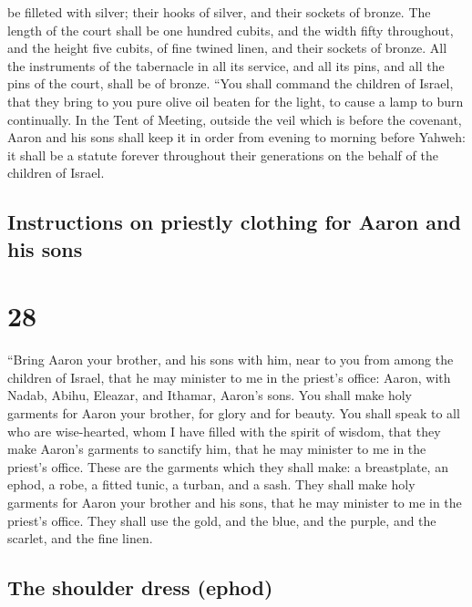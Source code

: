 be filleted with silver; their hooks of silver, and their sockets of
bronze.  The length of the court shall be one hundred
cubits, and the width fifty throughout, and the height five cubits, of
fine twined linen, and their sockets of bronze.  All the
instruments of the tabernacle in all its service, and all its pins, and
all the pins of the court, shall be of bronze.  ``You
shall command the children of Israel, that they bring to you pure olive
oil beaten for the light, to cause a lamp to burn continually.
 In the Tent of Meeting, outside the veil which is before
the covenant, Aaron and his sons shall keep it in order from evening to
morning before Yahweh: it shall be a statute forever throughout their
generations on the behalf of the children of Israel.

\hypertarget{instructions-on-priestly-clothing-for-aaron-and-his-sons}{%
\subsection{Instructions on priestly clothing for Aaron and his
sons}\label{instructions-on-priestly-clothing-for-aaron-and-his-sons}}

\hypertarget{section-27}{%
\section{28}\label{section-27}}

 ``Bring Aaron your brother, and his sons with him, near
to you from among the children of Israel, that he may minister to me in
the priest's office: Aaron, with Nadab, Abihu, Eleazar, and Ithamar,
Aaron's sons.  You shall make holy garments for Aaron your
brother, for glory and for beauty.  You shall speak to all
who are wise-hearted, whom I have filled with the spirit of wisdom, that
they make Aaron's garments to sanctify him, that he may minister to me
in the priest's office.  These are the garments which they
shall make: a breastplate, an ephod, a robe, a fitted tunic, a turban,
and a sash. They shall make holy garments for Aaron your brother and his
sons, that he may minister to me in the priest's office. 
They shall use the gold, and the blue, and the purple, and the scarlet,
and the fine linen.

\hypertarget{the-shoulder-dress-ephod}{%
\subsection{The shoulder dress (ephod)}\label{the-shoulder-dress-ephod}}

